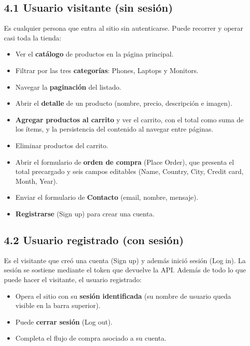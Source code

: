 \subsection*{4.1 Usuario visitante (sin sesión)}

Es cualquier persona que entra al sitio sin autenticarse. Puede recorrer y operar casi
toda la tienda:

\begin{itemize}
  \item Ver el \textbf{catálogo} de productos en la página principal.
  \item Filtrar por las tres \textbf{categorías}: Phones, Laptops y Monitors.
  \item Navegar la \textbf{paginación} del listado.
  \item Abrir el \textbf{detalle} de un producto (nombre, precio, descripción e
        imagen).
  \item \textbf{Agregar productos al carrito} y ver el carrito, con el total como suma
        de los ítems, y la persistencia del contenido al navegar entre páginas.
  \item Eliminar productos del carrito.
  \item Abrir el formulario de \textbf{orden de compra} (Place Order), que presenta el
        total precargado y seis campos editables (Name, Country, City, Credit card,
        Month, Year).
  \item Enviar el formulario de \textbf{Contacto} (email, nombre, mensaje).
  \item \textbf{Registrarse} (Sign up) para crear una cuenta.
\end{itemize}

\subsection*{4.2 Usuario registrado (con sesión)}

Es el visitante que creó una cuenta (Sign up) y además inició sesión (Log in). La
sesión se sostiene mediante el token que devuelve la API. Además de todo lo que puede
hacer el visitante, el usuario registrado:

\begin{itemize}
  \item Opera el sitio con su \textbf{sesión identificada} (su nombre de usuario queda
        visible en la barra superior).
  \item Puede \textbf{cerrar sesión} (Log out).
  \item Completa el flujo de compra asociado a su cuenta.
\end{itemize}

